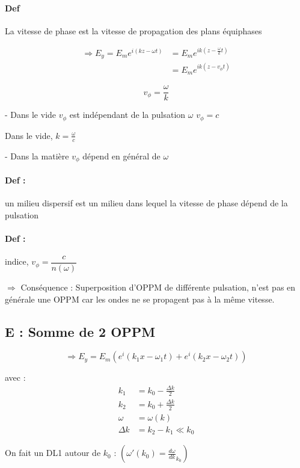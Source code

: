 \documentclass[12pt,a4paper]{report}
\begin{document}
\paragraph{Def}
La vitesse de phase est la vitesse de propagation des plans équiphases

\begin{align*}
	\Rightarrow E_y = E_m e^{i(kz - \omega t)} &=  E_m e^{ik(z - \frac{\omega}{k} t)}\\
	&= E_m e^{ik(z-v_\phi t)}
\end{align*}

\[
	v_\phi = \dfrac{\omega}{k}
\]

- Dans le vide \(v_\phi\) est indépendant de la pulsation \(\omega\) \(v_\phi = c\)

Dans le vide, \(k = \frac{\omega}{c}\)

- Dans la matière \(v_\phi\) dépend en général de \(\omega\)

\paragraph{Def :} un milieu dispersif est un milieu dans lequel la vitesse de phase dépend de la pulsation

\paragraph{Def :} indice, \( v_\phi = \dfrac{c}{n(\omega)}\)

\(\Rightarrow\) Conséquence : Superposition d'OPPM de différente pulsation, n'est pas en générale une OPPM car les ondes ne se propagent pas à la même vitesse.

\subsection{E : Somme de 2 OPPM}

\[
	\Rightarrow E_y = E_m \left( e^i(k_1 x - \omega_1 t) + e^i(k_2 x - \omega_2 t) \right)
\]

avec :
\begin{align*}
	k_1 &= k_0 - \frac{\Delta k}{2}\\
	k_2 &= k_0 + \frac{\Delta k}{2}\\
	\omega &= \omega(k)\\
	\Delta k &= k_2 - k_1 \ll k_0
\end{align*}

On fait un DL1 autour de \(k_0\) : \(\left( \omega'(k_0) = \frac{d\omega}{d k}_{k_0} \right)\)
\end{document}
